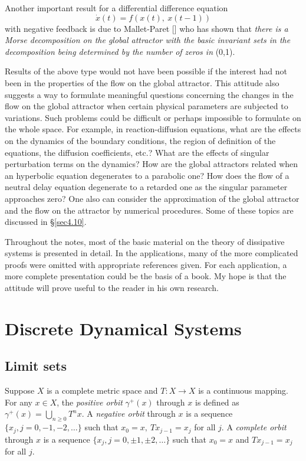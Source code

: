\documentclass{surv-l}
\theoremstyle{plain}
\theoremstyle{definition}
\numberwithin{equation}{section}
\numberwithin{figure}{chapter}
\begin{document}
Another important result for a differential difference equation
\begin{equation*}
\dot{x}(t)=f(x(t),\ x(t-1))
\end{equation*}
with negative feedback is due to Mallet-Paret [\citeyear{1985m}] who has shown that \emph{there is a Morse decomposition on the global attractor with the basic invariant sets in the decomposition being determined by the number of zeros in} (0,1).

Results of the above type would not have been possible if the interest had not been in the properties of the flow on the global attractor. This attitude also suggests a way to formulate meaningful questions concerning the changes in the flow on the global attractor when certain physical parameters are subjected to variations. Such problems could be difficult or perhaps impossible to formulate on the whole space. For example, in reaction-diffusion equations, what are the effects on the dynamics of the boundary conditions, the region of definition of the equations, the diffusion coefficients, etc.? What are the effects of singular perturbation terms on the dynamics? How are the global attractors related when an hyperbolic equation degenerates to a parabolic one? How does the flow of a neutral delay equation degenerate to a retarded one as the singular parameter approaches zero? One also can consider the approximation of the global attractor and the flow on the attractor by numerical procedures. Some of these topics are discussed in \S \ref{sec4.10}.

Throughout the notes, most of the basic material on the theory of dissipative systems is presented in detail. In the applications, many of the more complicated proofs were omitted with appropriate references given. For each application, a more complete presentation could be the basis of a book. My hope is that the attitude will prove useful to the reader in his own research.

\chapter{Discrete Dynamical Systems}\label{chap02}


\section{Limit sets}\label{sec2.1}


Suppose $X$ is a complete metric space and $T\!:X\rightarrow X$ is a continuous mapping. For any $x\in X$, the \emph{positive orbit} $\gamma^{+}(x)$ through $x$ is defined as
$\gamma^{+}(x)=\bigcup_{n \geq 0}T^{n}x$. A \emph{negative orbit} through $x$ is a sequence $\{x_{j},j=0, -1, -2, \ldots\}$ such that $x_{0}=x,\ Tx_{j-1}=x_{j}$ for all $j$. A \emph{complete orbit} through $x$ is a sequence $\{x_{j},j=0, \pm 1, \pm 2,\ldots\}$ such that $x_{0}=x$ and $Tx_{j-1}=x_{j}$ for all $j$.
\end{document}
